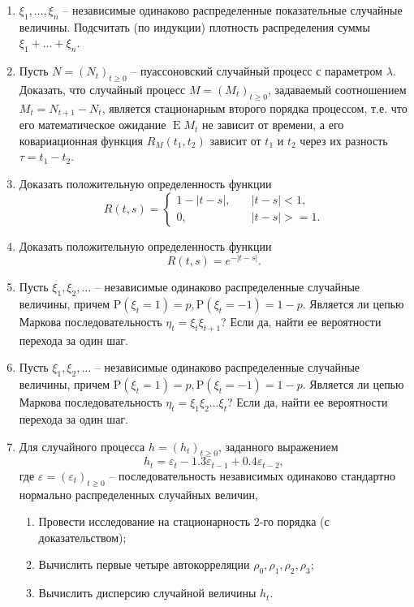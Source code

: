 \documentclass[a4paper,12pt]{extreport}
\renewcommand{\=}[1]{\stackrel{#1}{=}} %
\newcommand{\Expect}{\mathop{{}\mathrm{E}}}
\newcommand{\Proba}{\mathrm{P}}
\newcommand{\generaltime}{t \geqslant 0}
\newcommand{\newprocess}[1]{
	\ensuremath{
		#1 = \left(#1 _t\right)_{\generaltime}
	}
}
\begin{document}
\begin{enumerate}
	\item $\xi_1, \ldots, \xi_n$ -- независимые одинаково распределенные 
	показательные случайные величины.
	Подсчитать (по индукции) плотность распределения суммы
	$\xi_1 + \ldots + \xi_n$.

	\item Пусть $\newprocess{N}$ -- пуассоновский случайный
	процесс с параметром $\lambda$. Доказать, что случайный
	процесс $\newprocess{M}$, задаваемый соотношением
	$M_t = N_{t+1} - N_t$, является стационарным второго порядка
	процессом, т.е. что его математическое ожидание $\Expect M_t$
	не зависит от времени, а его ковариационная функция
	$R_M(t_1, t_2)$ зависит от $t_1$ и $t_2$ через их разность
	$\tau = t_1 - t_2$.

	\item Доказать положительную определенность функции
	\[
	R(t, s) = 
			\begin{cases}
				1 - |t - s|, \quad & |t - s| < 1, \\
				0, \quad & |t - s| >= 1.
			\end{cases}
	\]

	\item Доказать положительную определенность функции
	\[
	R(t, s) = e^{- |t - s|}.
	\]

	\item Пусть $\xi_1, \xi_2, \ldots$ -- независимые одинаково
	распределенные случайные величины, причем
	$\Proba (\xi_t = 1) = p, \Proba (\xi_t = -1) = 1 - p$.
	Является ли цепью Маркова последовательность
	$\eta_t = \xi_t \xi_{t + 1}$? Если да, 
	найти ее вероятности перехода за один шаг.

	\item Пусть $\xi_1, \xi_2, \ldots$ -- независимые одинаково
	распределенные случайные величины, причем
	$\Proba (\xi_t = 1) = p, \Proba (\xi_t = -1) = 1 - p$.
	Является ли цепью Маркова последовательность
	$\eta_t = \xi_1 \xi_2 \ldots \xi_t$? Если да, 
	найти ее вероятности перехода за один шаг.

	\item Для случайного процесса $\newprocess{h}$, заданного выражением
	\[
	h_t = \varepsilon_t - 1.3 \varepsilon_{t-1} + 0.4 \varepsilon_{t-2},
	\]
	где $\newprocess{\varepsilon}$ -- последовательность независимых
	одинаково стандартно нормально распределенных случайных величин,
	\begin{enumerate}
	\item Провести исследование на стационарность 2-го порядка (с доказательством);
	\item Вычислить первые четыре автокорреляции $\rho_0, \rho_1, \rho_2, \rho_3$;
	\item Вычислить дисперсию случайной величины $h_t$.
	\end{enumerate}


\end{enumerate}
\end{document}
